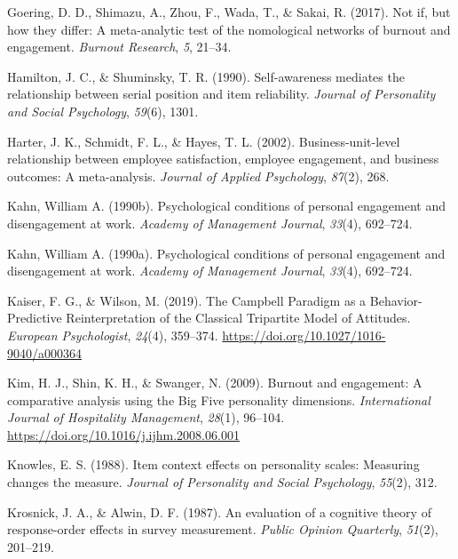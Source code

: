 \documentclass[
  man]{apa6}
\newlength{\cslhangindent}
\newlength{\cslentryspacingunit} %
\newenvironment{CSLReferences}[2] %
 {%
  \setlength{\parindent}{0pt}
  \ifodd #1
  \let\oldpar\par
  \def\par{\hangindent=\cslhangindent\oldpar}
  \fi
  \setlength{\parskip}{#2\cslentryspacingunit}
 }%
 {}
\begin{document}
\begin{CSLReferences}{1}{0}
\leavevmode{}%
Goering, D. D., Shimazu, A., Zhou, F., Wada, T., \& Sakai, R. (2017). Not if, but how they differ: A meta-analytic test of the nomological networks of burnout and engagement. \emph{Burnout Research}, \emph{5}, 21--34.

\leavevmode{}%
Hamilton, J. C., \& Shuminsky, T. R. (1990). Self-awareness mediates the relationship between serial position and item reliability. \emph{Journal of Personality and Social Psychology}, \emph{59}(6), 1301.

\leavevmode{}%
Harter, J. K., Schmidt, F. L., \& Hayes, T. L. (2002). Business-unit-level relationship between employee satisfaction, employee engagement, and business outcomes: A meta-analysis. \emph{Journal of Applied Psychology}, \emph{87}(2), 268.

\leavevmode{}%
Kahn, William A. (1990b). Psychological conditions of personal engagement and disengagement at work. \emph{Academy of Management Journal}, \emph{33}(4), 692--724.

\leavevmode{}%
Kahn, William A. (1990a). Psychological conditions of personal engagement and disengagement at work. \emph{Academy of Management Journal}, \emph{33}(4), 692--724.

\leavevmode{}%
Kaiser, F. G., \& Wilson, M. (2019). The {Campbell} {Paradigm} as a {Behavior}-{Predictive} {Reinterpretation} of the {Classical} {Tripartite} {Model} of {Attitudes}. \emph{European Psychologist}, \emph{24}(4), 359--374. \url{https://doi.org/10.1027/1016-9040/a000364}

\leavevmode{}%
Kim, H. J., Shin, K. H., \& Swanger, N. (2009). Burnout and engagement: {A} comparative analysis using the {Big} {Five} personality dimensions. \emph{International Journal of Hospitality Management}, \emph{28}(1), 96--104. \url{https://doi.org/10.1016/j.ijhm.2008.06.001}

\leavevmode{}%
Knowles, E. S. (1988). Item context effects on personality scales: Measuring changes the measure. \emph{Journal of Personality and Social Psychology}, \emph{55}(2), 312.

\leavevmode{}%
Krosnick, J. A., \& Alwin, D. F. (1987). An evaluation of a cognitive theory of response-order effects in survey measurement. \emph{Public Opinion Quarterly}, \emph{51}(2), 201--219.


\end{CSLReferences}
\end{document}
